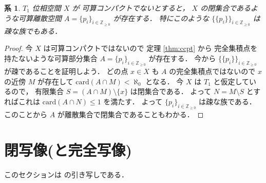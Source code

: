 \documentclass[leqno, a4paper, 12pt]{jsarticle}
\newtheorem{cor}[thm]{系}
\newcommand{\zz}{\mathbb{Z}}
\newcommand{\card}{\mathrm{card}}
\begin{document}
\begin{cor}\label{cor:ccpt}
$T_{1}$
位相空間
$X$
が
可算コンパクトでないとすると，
$X$
の閉集合であるような可算離散空間
$A=\{p_{i}\}_{i\in \zz_{\ge 0}}$
が存在する．
特にこのような
$\{\{p_{i}\}\}_{i\in \zz_{\ge 0}}$
は疎な族でもある．
\end{cor}
\begin{proof}
今
$X$
は可算コンパクトではないので
定理
\ref{thm:ccpt}
から
完全集積点を持たないような可算部分集合
$A=\{p_{i}\}_{i\in \zz_{\ge 0}}$
が存在する．
今から
$\{\{p_{i}\}\}_{i\in \zz_{\ge 0}}$
が疎であることを証明しよう．
どの点
$x\in X$
も
$A$
の完全集積点ではないので
$x$
の近傍
$M$
が存在して
$\card(A\cap M)<\aleph_{0}$
となる．
今
$X$
は
$T_{1}$
と仮定しているので，
有限集合
$S=(A\cap M)\setminus \{x\}$
は閉集合である．
よって
$N=M\setminus S$
とすればこれは
$\card(A\cap N)\le 1$
を満たす．
よって
$\{p_{i}\}_{i\in \zz_{\ge 0}}$
は疎な族である．
このことから
$A$
が離散集合で閉集合であることもわかる．
\end{proof}


\section{閉写像(と完全写像)}

このセクションは
\cite{Den2}
の引き写しである．
\end{document}
